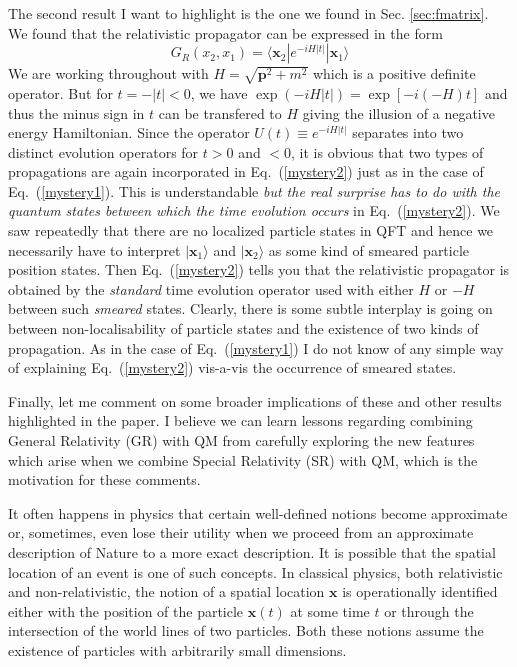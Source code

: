 \documentclass[12pt]{article}
\def\eq#1{{Eq.~(\ref{#1})}}
\def\ket#1{|#1\rangle}                    %
\def\bk#1#2#3{{\langle #1|#2|#3\rangle}}  %
\begin{document}
The second result I want to highlight is the one we found in Sec. \ref{sec:fmatrix}. We found that the relativistic propagator can be expressed in the form
\begin{equation}
 G_R (x_2,x_1)  = \bk{\bm{x}_2}{e^{-iH|t|}}{\bm{x}_1}
  \label{mystery2}
\end{equation} 
We are working throughout with $H=\sqrt{\bm{p}^2+m^2} $ which is a positive definite operator.
But for $t=-|t|<0$, we have $\exp(-iH|t|) = \exp[-i(-H)t]$ and thus the minus sign in $t$ can be transfered to $H$ giving the illusion of a negative energy Hamiltonian. Since the operator $U(t) \equiv e^{-iH|t|}$ separates into two distinct evolution operators for $t>0$ and $<0$, it is obvious that two types of propagations are again incorporated in \eq{mystery2} just as in the case of \eq{mystery1}. This is understandable \textit{but the real surprise has to do with the quantum states between which the time evolution occurs} in \eq{mystery2}. We saw repeatedly that there are no localized particle states in QFT and hence we necessarily have to interpret $\ket{{\bm x}_1}$ and $\ket{{\bm x}_2}$ as some kind of smeared particle position states. Then \eq{mystery2} tells you that the relativistic propagator is obtained by the \textit{standard} time evolution operator used with either $H$ or $-H$ between such \textit{smeared} states. Clearly, there is some subtle interplay is going on between non-localisability of particle states and the existence of two kinds of propagation. As in the case of \eq{mystery1} I do not know of any simple way of explaining  \eq{mystery2} vis-a-vis the occurrence of smeared states.


Finally, let me comment on some broader implications of these and other results highlighted in the paper. 
I believe we can learn lessons regarding combining General Relativity (GR) with QM from carefully exploring the new features which arise when we combine Special Relativity (SR) with QM, which is the motivation for these comments.

It often happens in physics that certain well-defined notions  become approximate or, sometimes, even lose their utility when we proceed from an approximate description of Nature to a more exact description. It is possible that the  spatial location of an event is one of such concepts. In classical physics, both relativistic and non-relativistic, the notion of a spatial location $\bm{x}$ is operationally identified either with the position of the particle $\bm{x}(t)$ at some time $t$ or through the intersection of the world lines of two particles. Both these notions assume the existence of particles with arbitrarily small dimensions. 
\end{document}
